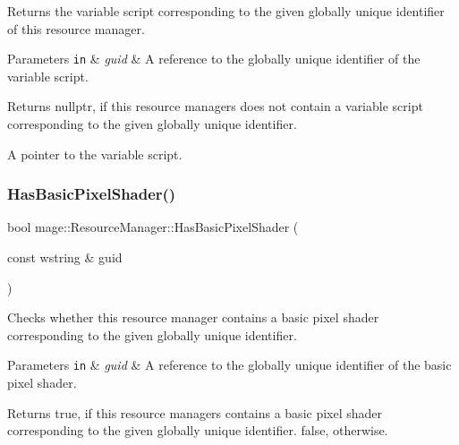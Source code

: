 Returns the variable script corresponding to the given globally unique identifier of this resource manager.


\begin{DoxyParams}[1]{Parameters}
\mbox{\tt in}  & {\em guid} & A reference to the globally unique identifier of the variable script. \\
\hline
\end{DoxyParams}
\begin{DoxyReturn}{Returns}
{\ttfamily nullptr}, if this resource managers does not contain a variable script corresponding to the given globally unique identifier. 

A pointer to the variable script. 
\end{DoxyReturn}
\hypertarget{classmage_1_1_resource_manager_a3027058c2b55a131a2070d0f31080c29}{}\label{classmage_1_1_resource_manager_a3027058c2b55a131a2070d0f31080c29} 
\subsubsection{\texorpdfstring{Has\+Basic\+Pixel\+Shader()}{HasBasicPixelShader()}}
{\footnotesize\ttfamily bool mage\+::\+Resource\+Manager\+::\+Has\+Basic\+Pixel\+Shader (\begin{DoxyParamCaption}\item[{const wstring \&}]{guid }\end{DoxyParamCaption})\hspace{0.3cm}{\ttfamily [noexcept]}}

Checks whether this resource manager contains a basic pixel shader corresponding to the given globally unique identifier.


\begin{DoxyParams}[1]{Parameters}
\mbox{\tt in}  & {\em guid} & A reference to the globally unique identifier of the basic pixel shader. \\
\hline
\end{DoxyParams}
\begin{DoxyReturn}{Returns}
{\ttfamily true}, if this resource managers contains a basic pixel shader corresponding to the given globally unique identifier. {\ttfamily false}, otherwise. 
\end{DoxyReturn}
\hypertarget{classmage_1_1_resource_manager_ab2e83271c42c8250bf0ffe8ec59d5ced}{}\label{classmage_1_1_resource_manager_ab2e83271c42c8250bf0ffe8ec59d5ced} 
